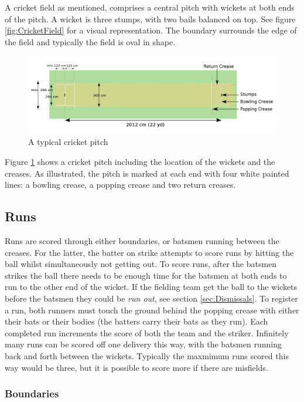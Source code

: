 \documentclass[12pt,a4paper]{report}
\theoremstyle{definition}
\begin{document}
A cricket field as mentioned, comprises a central pitch with wickets at both ends of the pitch. 
A wicket is three stumps, with two bails balanced on top. 
See figure \ref{fig:CricketField} for a visual representation.
The boundary surrounds the edge of the field and typically the field is oval in shape.

\begin{figure}[H]
    \centering
    \includegraphics[width=0.8\linewidth]{Cricket_Pitch.png}
    \caption{A typical cricket pitch \citep{cricketWiki}}
    \label{fig:CricketPitch}
\end{figure}

Figure \ref{fig:CricketPitch} shows a cricket pitch including the location of the wickets and the creases.
As illustrated, the pitch is marked at each end with four white painted lines: a bowling crease, a popping crease and two return creases.

\subsection{Runs}

Runs are scored through either boundaries, or batsmen running between the creases.
For the latter, the batter on strike attempts to score runs by hitting the ball whilst simultaneously not getting out. 
To score runs, after the batsmen strikes the ball there needs to be enough time for the batsmen at both ends to run to the other end of the wicket.
If the fielding team get the ball to the wickets before the batsmen they could be \emph{run out}, see section \ref{sec:Dismissals}.
To register a run, both runners must touch the ground behind the popping crease with either their bats or their bodies (the batters carry their bats as they run). 
Each completed run increments the score of both the team and the striker.
Infinitely many runs can be scored off one delivery this way, with the batsmen running back and forth between the wickets.
Typically the maxmimum runs scored this way would be three, but it is possible to score more if there are misfields.

\subsubsection{Boundaries} \label{sec:Boundaries}
\end{document}
